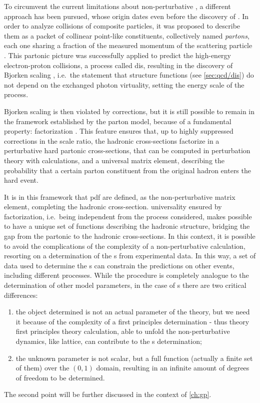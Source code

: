 To circumvent the current limitations about non-perturbative \qft, a different
approach has been pursued, whose origin dates even before the discovery of
\qcd.
In order to analyze collisions of composite particles, it was proposed to
describe them as a packet of collinear point-like constituents, collectively
named \textit{partons}, each one sharing a fraction of the measured momentum of
the scattering particle \cite{Feynman:1969wa}.
%
This partonic picture was successfully applied to predict the high-energy
electron-proton collisions, a process called \acrfull{dis}, resulting in the
discovery of Bjorken scaling \cite{Bjorken:1967fb}, i.e.\ the statement that
\dis structure functions (see \cref{sec:qcd/dis}) do not depend on the
exchanged photon virtuality, setting the energy scale of the process.

Bjorken scaling is then violated by \qcd corrections, but it is still possible
to remain in the framework established by the parton model, because of a
fundamental \qcd property: factorization \cite{Collins:1989gx}.
%
This feature ensures that, up to highly suppressed corrections in the scale
ratio, the hadronic cross-sections factorize in a perturbative hard partonic
cross-sections, that can be computed in perturbation theory with \pqft
calculations, and a universal matrix element, describing the probability that a
certain parton constituent from the original hadron enters the hard event.

It is in this framework that \acrfull{pdf} are defined, as the non-perturbative
matrix element, completing the hadronic cross-section.
\pdf universality ensured by factorization, i.e.\ being independent from the
process considered, makes possible to have a unique set of functions describing
the hadronic structure, bridging the gap from the partonic to the hadronic
cross-sections.
%
In this context, it is possible to avoid the complications of the complexity of
a non-perturbative calculation, resorting on a determination of the \pdf{}s
from experimental data.
In this way, a set of data used to determine the \pdf{}s can constrain the
predictions on other events, including different processes.
%
While the procedure is completely analogue to the determination of other \sm
model parameters, in the case of \pdf{}s there are two critical differences:
\begin{enumerate}
	\item the object determined is not an actual parameter of the theory, but
	      we need it because of the complexity of a first principles
	      determination - thus theory first principles theory calculation, able
	      to unfold the non-perturbative dynamics, like lattice, can contribute
	      to the \pdf{}s determination;
	\item the unknown parameter is not scalar, but a full function (actually a
	      finite set of them) over the $(0,1)$ domain, resulting in an infinite
	      amount of degrees of freedom to be determined.
\end{enumerate}
The second point will be further discussed in the context of \cref{ch:gp}.

